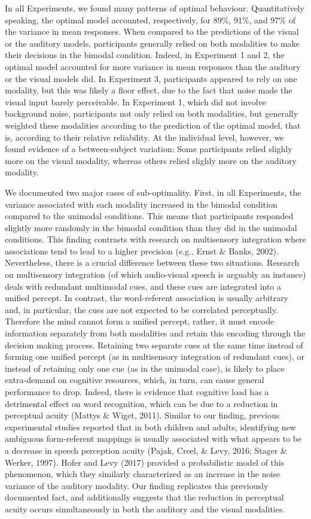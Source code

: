 \documentclass[english,man]{apa6}
\theoremstyle{definition}
\theoremstyle{definition}
\theoremstyle{definition}
\theoremstyle{remark}
\begin{document}
In all Experiments, we found many patterns of optimal behaviour.
Quantitatively speaking, the optimal model accounted, respectively, for
89\%, 91\%, and 97\% of the variance in mean responses. When compared to
the predictions of the visual or the auditory models, participants
generally relied on both modalities to make their decisions in the
bimodal condition. Indeed, in Experiment 1 and 2, the optimal model
accounted for more variance in mean responses than the auditory or the
visual models did. In Experiment 3, participants appeared to rely on one
modality, but this was likely a floor effect, due to the fact that noise
made the visual input barely perceivable. In Experiment 1, which did not
involve background noise, participants not only relied on both
modalities, but generally weighted these modalities according to the
prediction of the optimal model, that is, according to their relative
reliability. At the individual level, however, we found evidence of a
between-subject variation: Some participants relied slighly more on the
visual modality, whereas others relied slighly more on the auditory
modality.

We documented two major cases of sub-optimality. First, in all
Experiments, the variance associated with each modality increased in the
bimodal condition compared to the unimodal conditions. This means that
participants responded slightly more randomly in the bimodal condition
than they did in the unimodal conditions. This finding contrasts with
research on multisensory integration where associations tend to lead to
a higher precision (e.g., Ernst \& Banks, 2002). Nevertheless, there is
a crucial difference between these two situations. Research on
multisensory integration (of which audio-visual speech is arguably an
instance) deals with redundant multimodal cues, and these cues are
integrated into a unified percept. In contrast, the word-referent
association is usually arbitrary and, in particular, the cues are not
expected to be correlated perceptually. Therefore the mind cannot form a
unified percept, rather, it must encode information separately from both
modalities and retain this encoding through the decision making process.
Retaining two separate cues at the same time instead of forming one
unified percept (as in multisensory integration of redundant cues), or
instead of retaining only one cue (as in the unimodal case), is likely
to place extra-demand on cognitive resources, which, in turn, can cause
general performance to drop. Indeed, there is evidence that cognitive
load has a detrimental effect on word recognition, which can be due to a
reduction in perceptual acuity (Mattys \& Wiget, 2011). Similar to our
finding, previous experimental studies reported that in both children
and adults, identifying new ambiguous form-referent mappings is usually
associated with what appears to be a decrease in speech perception
acuity (Pajak, Creel, \& Levy, 2016; Stager \& Werker, 1997). Hofer and
Levy (2017) provided a probabilistic model of this phenomenon, which
they similarly characterized as an increase in the noise variance of the
auditory modality. Our finding replicates this previously documented
fact, and additionally suggests that the reduction in perceptual acuity
occurs simultaneously in both the auditory and the visual modalities.
\end{document}

